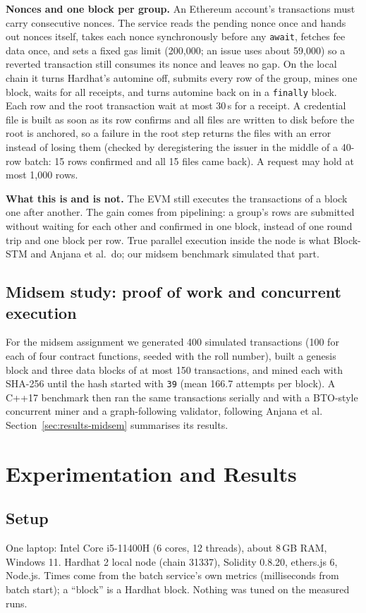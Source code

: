 \documentclass[10pt,twocolumn]{article}
\begin{document}
\textbf{Nonces and one block per group.} An Ethereum account's transactions must carry consecutive nonces. The service reads the pending nonce once and hands out nonces itself, takes each nonce synchronously before any \texttt{await}, fetches fee data once, and sets a fixed gas limit (200{,}000; an issue uses about 59{,}000) so a reverted transaction still consumes its nonce and leaves no gap. On the local chain it turns Hardhat's automine off, submits every row of the group, mines one block, waits for all receipts, and turns automine back on in a \texttt{finally} block. Each row and the root transaction wait at most 30\,s for a receipt. A credential file is built as soon as its row confirms and all files are written to disk before the root is anchored, so a failure in the root step returns the files with an error instead of losing them (checked by deregistering the issuer in the middle of a 40-row batch: 15 rows confirmed and all 15 files came back). A request may hold at most 1{,}000 rows.

\textbf{What this is and is not.} The EVM still executes the transactions of a block one after another. The gain comes from pipelining: a group's rows are submitted without waiting for each other and confirmed in one block, instead of one round trip and one block per row. True parallel execution inside the node is what Block-STM and Anjana et al.\ do; our midsem benchmark simulated that part.

\subsection{Midsem study: proof of work and concurrent execution}
\label{sec:midsem}
For the midsem assignment we generated 400 simulated transactions (100 for each of four contract functions, seeded with the roll number), built a genesis block and three data blocks of at most 150 transactions, and mined each with SHA-256 until the hash started with \texttt{39} (mean 166.7 attempts per block). A C++17 benchmark then ran the same transactions serially and with a BTO-style concurrent miner and a graph-following validator, following Anjana et al. Section~\ref{sec:results-midsem} summarises its results.

\section{Experimentation and Results}

\subsection{Setup}
One laptop: Intel Core i5-11400H (6 cores, 12 threads), about 8\,GB RAM, Windows 11. Hardhat 2 local node (chain 31337), Solidity 0.8.20, ethers.js 6, Node.js. Times come from the batch service's own metrics (milliseconds from batch start); a ``block'' is a Hardhat block. Nothing was tuned on the measured runs.
\end{document}
